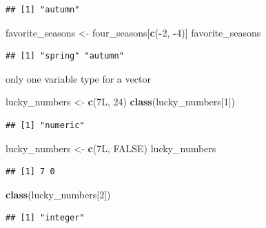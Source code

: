 \documentclass[
]{book}
\newenvironment{Shaded}{\begin{snugshade}}{\end{snugshade}}
\newcommand{\ConstantTok}[1]{\textcolor[rgb]{0.56,0.35,0.01}{#1}}
\newcommand{\DecValTok}[1]{\textcolor[rgb]{0.00,0.00,0.81}{#1}}
\newcommand{\FunctionTok}[1]{\textcolor[rgb]{0.13,0.29,0.53}{\textbf{#1}}}
\newcommand{\NormalTok}[1]{#1}
\newcommand{\OtherTok}[1]{\textcolor[rgb]{0.56,0.35,0.01}{#1}}
\newcommand{\SpecialCharTok}[1]{\textcolor[rgb]{0.81,0.36,0.00}{\textbf{#1}}}
\theoremstyle{definition}
\theoremstyle{definition}
\theoremstyle{definition}
\theoremstyle{definition}
\theoremstyle{remark}
\begin{document}
\begin{verbatim}
## [1] "autumn"
\end{verbatim}

\begin{Shaded}
\begin{Highlighting}[]
\NormalTok{favorite\_seasons }\OtherTok{\textless{}{-}}\NormalTok{ four\_seasons[}\FunctionTok{c}\NormalTok{(}\SpecialCharTok{{-}}\DecValTok{2}\NormalTok{, }\SpecialCharTok{{-}}\DecValTok{4}\NormalTok{)]}
\NormalTok{favorite\_seasons}
\end{Highlighting}
\end{Shaded}

\begin{verbatim}
## [1] "spring" "autumn"
\end{verbatim}

only one variable type for a vector

\begin{Shaded}
\begin{Highlighting}[]
\NormalTok{lucky\_numbers }\OtherTok{\textless{}{-}} \FunctionTok{c}\NormalTok{(7L, }\DecValTok{24}\NormalTok{)}
\FunctionTok{class}\NormalTok{(lucky\_numbers[}\DecValTok{1}\NormalTok{])}
\end{Highlighting}
\end{Shaded}

\begin{verbatim}
## [1] "numeric"
\end{verbatim}

\begin{Shaded}
\begin{Highlighting}[]
\NormalTok{lucky\_numbers }\OtherTok{\textless{}{-}} \FunctionTok{c}\NormalTok{(7L, }\ConstantTok{FALSE}\NormalTok{)}
\NormalTok{lucky\_numbers}
\end{Highlighting}
\end{Shaded}

\begin{verbatim}
## [1] 7 0
\end{verbatim}

\begin{Shaded}
\begin{Highlighting}[]
\FunctionTok{class}\NormalTok{(lucky\_numbers[}\DecValTok{2}\NormalTok{])}
\end{Highlighting}
\end{Shaded}

\begin{verbatim}
## [1] "integer"
\end{verbatim}
\end{document}

